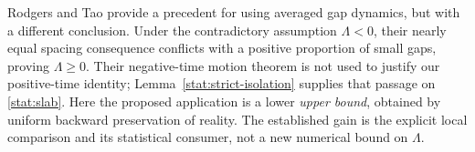 Rodgers and Tao \cite{RodgersTao2020Newman} provide a precedent for using
averaged gap dynamics, but with a different conclusion. Under the
contradictory assumption $\Lambda<0$, their nearly equal spacing
consequence conflicts with a positive proportion of small gaps, proving
$\Lambda\ge0$. Their negative-time motion theorem is not used to justify
our positive-time identity; Lemma~\ref{stat:strict-isolation} supplies
that passage on \eqref{stat:slab}. Here the proposed application is a
lower \emph{upper bound}, obtained by uniform backward preservation of
reality. The established gain is the explicit local comparison and its
statistical consumer, not a new numerical bound on $\Lambda$.
